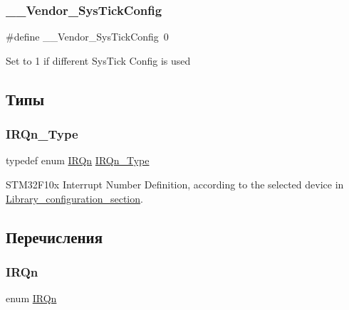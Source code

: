 \subsubsection{\texorpdfstring{\_\_Vendor\_SysTickConfig}{\_\_Vendor\_SysTickConfig}}
{\footnotesize\ttfamily \#define \+\_\+\+\_\+\+Vendor\+\_\+\+Sys\+Tick\+Config~0}

Set to 1 if different Sys\+Tick Config is used 

\subsection{Типы}
\mbox{\label{group___configuration__section__for___c_m_s_i_s_gac3af4a32370fb28c4ade8bf2add80251}} 
\subsubsection{\texorpdfstring{IRQn\_Type}{IRQn\_Type}}
{\footnotesize\ttfamily typedef enum \mbox{\hyperlink{group___configuration__section__for___c_m_s_i_s_ga666eb0caeb12ec0e281415592ae89083}{I\+R\+Qn}}  \mbox{\hyperlink{group___configuration__section__for___c_m_s_i_s_gac3af4a32370fb28c4ade8bf2add80251}{I\+R\+Qn\+\_\+\+Type}}}



S\+T\+M32\+F10x Interrupt Number Definition, according to the selected device in \mbox{\hyperlink{group___library__configuration__section}{Library\+\_\+configuration\+\_\+section}}. 



\subsection{Перечисления}
\mbox{\label{group___configuration__section__for___c_m_s_i_s_ga666eb0caeb12ec0e281415592ae89083}} 
\subsubsection{\texorpdfstring{IRQn}{IRQn}}
{\footnotesize\ttfamily enum \mbox{\hyperlink{group___configuration__section__for___c_m_s_i_s_ga666eb0caeb12ec0e281415592ae89083}{I\+R\+Qn}}}



